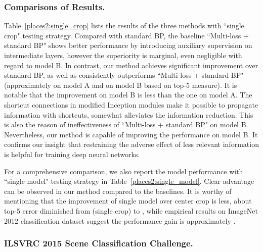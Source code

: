 \documentclass[runningheads]{llncs}
\begin{document}
\subsubsection{Comparisons of Results.} Table~\ref{places2:single_crop} lists the results of the three methods with ``single crop" testing strategy. Compared with standard BP, the baseline ``Multi-loss + standard BP" shows better performance by introducing auxiliary supervision on intermediate layers, however the superiority is marginal, even negligible with regard to model B. In contrast, our method achieves significant improvement over standard BP, as well as consistently outperforms ``Multi-loss + standard BP" (approximately  on model A and  on model B based on top-5 measure). It is notable that the improvement on model B is less than the one on model A. The shortcut connections in modified Inception modules make it possible to propagate information with shortcuts, somewhat alleviates the information reduction. This is also the reason of ineffectiveness of ``Multi-loss + standard BP" on model B. Nevertheless, our method is capable of improving the performance on model B. It confirms our insight that restraining the adverse effect of less relevant information is helpful for training deep neural networks.

For a comprehensive comparison, we also report the model performance with ``single model" testing strategy in Table~\ref{places2:single_model}. Clear advantage can be observed in our method compared to the baselines. It is worthy of mentioning that the improvement of single model over center crop is less, about  top-5 error diminished from  (single crop) to , while empirical results on ImageNet 2012 classification dataset suggest the performance gain is approximately  \cite{he_iccv2015,ioffe_2015}.

\subsubsection{ILSVRC 2015 Scene Classification Challenge.}
\end{document}
